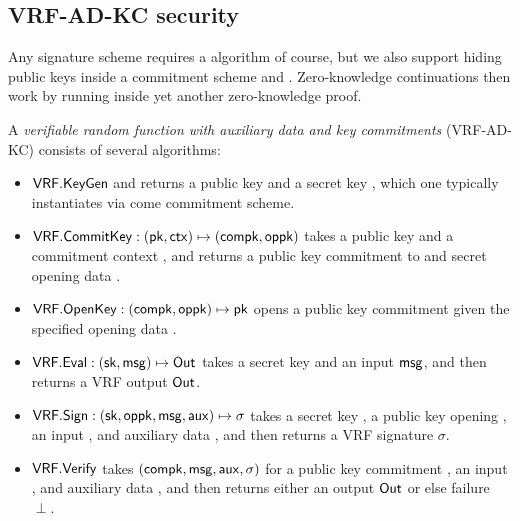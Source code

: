 
\subsection{VRF-AD-KC security}
\label{subsec:vrf_def}


Any signature scheme requires a \KeyGen algorithm of course, but we also
support hiding public keys inside a commitment scheme \CommitKey and \OpenKey.
Zero-knowledge continuations then work by running \OpenKey inside yet
another zero-knowledge proof. 

\begin{definition}
A {\em verifiable random function with auxiliary data and key commitments} (VRF-AD-KC) consists of several algorithms:
\begin{itemize}
\item ${\mathsf{VRF}}.{\mathsf{KeyGen}}$ and returns a public key \pk and a secret key \sk, which one typically instantiates via come commitment scheme. 
%
\item ${\mathsf{VRF}}.{\mathsf{CommitKey}} : (\mathsf{pk},\mathsf{ctx}) \mapsto (\mathsf{compk},\mathsf{oppk})$ takes a public key \pk and a commitment context \ctx, and returns a public key commitment \compk to \sk and secret opening data \openpk.
\item ${\mathsf{VRF}}.{\mathsf{OpenKey}} : (\mathsf{compk},\mathsf{oppk}) \mapsto \mathsf{pk}$ opens a public key commitment \compk given the specified opening data \openpk.
%
\item ${\mathsf{VRF}}.{\mathsf{Eval}} : (\mathsf{sk},\mathsf{msg}) \mapsto {\ensuremath{\mathsf{Out}}}$ takes a secret key \sk and an input $\mathsf{msg}$, and then returns a VRF output ${\mathsf{Out}}$.
\item ${\mathsf{VRF}}.{\mathsf{Sign}} : (\mathsf{sk},\mathsf{oppk},\mathsf{msg},\mathsf{aux}) \mapsto \sigma$ takes a secret key \sk, a public key opening \openpk, an input \msg, and auxiliary data \aux, and then returns a VRF signature $\sigma$.
\item ${\mathsf{VRF}}.{\mathsf{Verify}}$ takes $(\mathsf{compk},\mathsf{msg},\mathsf{aux},\sigma)$ for a public key commitment \compk, an input \msg, and auxiliary data \aux, and then returns either an output ${\mathsf{Out}}$ or else failure $\perp$.
\end{itemize}
\end{definition}


